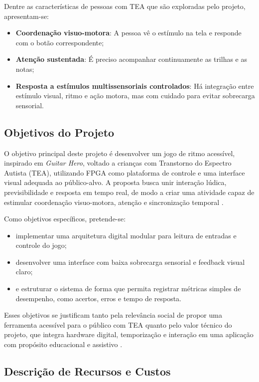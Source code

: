 \documentclass[a4paper,12pt,twoside]{article}
\begin{document}
Dentre as características de pessoas com TEA que são exploradas pelo projeto, apresentam-se:

\begin{itemize}
  \item \textbf{Coordenação visuo-motora}: A pessoa vê o estímulo na tela e responde com o botão correspondente;
  \item \textbf{Atenção sustentada}: É preciso acompanhar continuamente as trilhas e as notas;
  \item \textbf{Resposta a estímulos multissensoriais controlados}: Há integração entre estímulo visual, ritmo e ação motora, mas com cuidado para evitar sobrecarga sensorial.
\end{itemize}
\subsection{Objetivos do Projeto}\label{objetivos-do-projeto}

O objetivo principal deste projeto é desenvolver um jogo de ritmo acessível, inspirado em \emph{Guitar Hero}, voltado a crianças com Transtorno do Espectro Autista (TEA), utilizando FPGA como plataforma de controle e uma interface visual adequada ao público-alvo. A proposta busca unir interação lúdica, previsibilidade e resposta em tempo real, de modo a criar uma atividade capaz de estimular coordenação visuo-motora, atenção e sincronização temporal \cite{kanzari2025,dobesh2023}.

Como objetivos específicos, pretende-se:
\begin{itemize}
  \item implementar uma arquitetura digital modular para leitura de entradas e controle do jogo;
  \item desenvolver uma interface com baixa sobrecarga sensorial e feedback visual claro;
  \item e estruturar o sistema de forma que permita registrar métricas simples de desempenho, como acertos, erros e tempo de resposta.
\end{itemize} 
Esses objetivos se justificam tanto pela relevância social de propor uma ferramenta acessível para o público com TEA quanto pelo valor técnico do projeto, que integra hardware digital, temporização e interação em uma aplicação com propósito educacional e assistivo \cite{carvalho2024,bagchi2023,begel2017}.

\subsection{Descrição de Recursos e
Custos}\label{descriuxe7uxe3o-de-recursos-e-custos}
\end{document}
